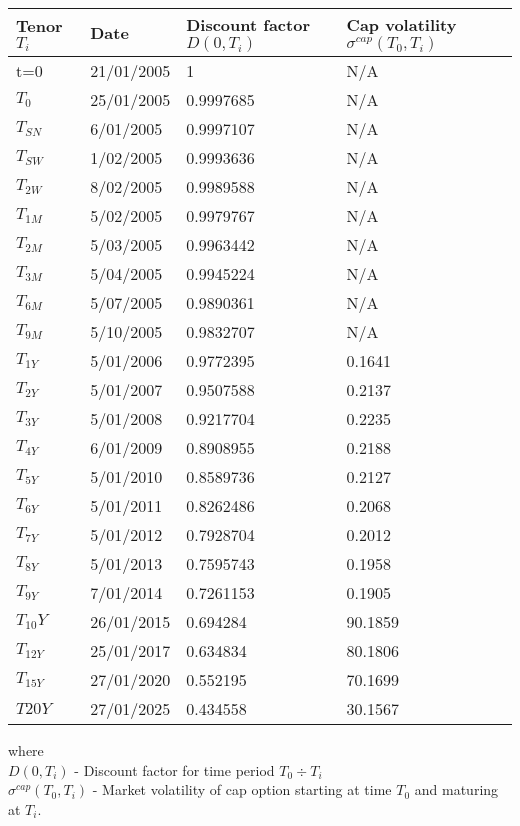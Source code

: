 \documentclass[11pt]{article}
\numberwithin{equation}{subsection}
\begin{document}
{
	\centering
	\begin{tabular}{|l|l|l|l|}
		\hline
		Tenor \(T_i\) & Date & Discount factor \(D(0, T_i)\) & Cap volatility \(\sigma^{cap}(T_0, T_i)\) \\		
		\hline		
		t=0	  &  21/01/2005 &  1	      &  N/A \\
		\hline
		\(T_0\)	  &  25/01/2005 &  0.9997685  &  N/A \\
		\hline
		\(T_{SN}\)  &  6/01/2005  &  0.9997107  &  N/A \\
		\hline
		\(T_{SW}\)  &  1/02/2005  &  0.9993636  &  N/A \\
		\hline
		\(T_{2W}\)  &  8/02/2005  &  0.9989588  &  N/A \\
		\hline
		\(T_{1M}\)  &  5/02/2005  &  0.9979767  &  N/A \\
		\hline
		\(T_{2M}\)  &  5/03/2005  &  0.9963442  &  N/A \\
		\hline
		\(T_{3M}\)  &  5/04/2005  &  0.9945224  &  N/A \\
		\hline
		\(T_{6M}\)  &  5/07/2005  &  0.9890361  &  N/A \\
		\hline
		\(T_{9M}\)  &  5/10/2005  &  0.9832707  &  N/A \\
		\hline
		\(T_{1Y}\)  &  5/01/2006  &  0.9772395  &  0.1641 \\
		\hline
		\(T_{2Y}\)  &  5/01/2007  &  0.9507588  &  0.2137 \\
		\hline
		\(T_{3Y}\)  &  5/01/2008  &  0.9217704  &  0.2235 \\
		\hline
		\(T_{4Y}\)  &  6/01/2009  &  0.8908955  &  0.2188 \\
		\hline
		\(T_{5Y}\)  &  5/01/2010  &  0.8589736  &  0.2127 \\
		\hline
		\(T_{6Y}\)  &  5/01/2011  &  0.8262486  &  0.2068 \\
		\hline
		\(T_{7Y}\)  &  5/01/2012  &  0.7928704  &  0.2012 \\
		\hline
		\(T_{8Y}\)  &  5/01/2013  &  0.7595743  &  0.1958 \\
		\hline
		\(T_{9Y}\)  &  7/01/2014  &  0.7261153  &  0.1905 \\
		\hline
		\(T_{10}Y\)  &  26/01/2015 &  0.694284   &  90.1859 \\
		\hline
		\(T_{12Y}\)  &  25/01/2017 &  0.634834   &  80.1806 \\
		\hline
		\(T_{15Y}\)  &  27/01/2020 &  0.552195   &  70.1699 \\
		\hline
		\(T{20Y}\)  &  27/01/2025 &  0.434558   &  30.1567 \\
		\hline				 				
	\end{tabular}
}
\vskip 0.4cm
where \\
\(D(0, T_i)\) - Discount factor for time period \(T_0 \div T_i\)\\
\(\sigma^{cap}(T_0, T_i)\) - Market volatility of cap option starting at time \(T_0\) and maturing at \(T_i\).
\end{document}

